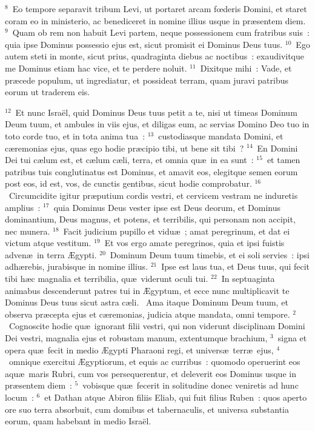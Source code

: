 ${}^{8}$~Eo tempore separavit tribum Levi, ut portaret arcam fœderis Domini, et staret coram eo in ministerio, ac benediceret in nomine illius usque in pr\ae sentem diem.
${}^{9}$~Quam ob rem non habuit Levi partem, neque possessionem cum fratribus suis~: quia ipse Dominus possessio ejus est, sicut promisit ei Dominus Deus tuus.
${}^{10}$~Ego autem steti in monte, sicut prius, quadraginta diebus ac noctibus~: exaudivitque me Dominus etiam hac vice, et te perdere noluit.
${}^{11}$~Dixitque mihi~: Vade, et pr\ae cede populum, ut ingrediatur, et possideat terram, quam juravi patribus eorum ut traderem eis.


${}^{12}$~Et nunc Isra\"el, quid Dominus Deus tuus petit a te, nisi ut timeas Dominum Deum tuum, et ambules in viis ejus, et diligas eum, ac servias Domino Deo tuo in toto corde tuo, et in tota anima tua~:
${}^{13}$~custodiasque mandata Domini, et c\ae remonias ejus, quas ego hodie pr\ae cipio tibi, ut bene sit tibi~?
${}^{14}$~En Domini Dei tui c\ae lum est, et c\ae lum c\ae li, terra, et omnia qu\ae\ in ea sunt~:
${}^{15}$~et tamen patribus tuis conglutinatus est Dominus, et amavit eos, elegitque semen eorum post eos, id est, vos, de cunctis gentibus, sicut hodie comprobatur.
${}^{16}$~Circumcidite igitur pr\ae putium cordis vestri, et cervicem vestram ne induretis amplius~:
${}^{17}$~quia Dominus Deus vester ipse est Deus deorum, et Dominus dominantium, Deus magnus, et potens, et terribilis, qui personam non accipit, nec munera.
${}^{18}$~Facit judicium pupillo et vidu\ae~; amat peregrinum, et dat ei victum atque vestitum.
${}^{19}$~Et vos ergo amate peregrinos, quia et ipsi fuistis adven\ae\ in terra \AE gypti.
${}^{20}$~Dominum Deum tuum timebis, et ei soli servies~: ipsi adh\ae rebis, jurabisque in nomine illius.
${}^{21}$~Ipse est laus tua, et Deus tuus, qui fecit tibi h\ae c magnalia et terribilia, qu\ae\ viderunt oculi tui.
${}^{22}$~In septuaginta animabus descenderunt patres tui in \AE gyptum, et ecce nunc multiplicavit te Dominus Deus tuus sicut astra c\ae li.
~Ama itaque Dominum Deum tuum, et observa pr\ae cepta ejus et c\ae remonias, judicia atque mandata, omni tempore.
${}^{2}$~Cognoscite hodie qu\ae\ ignorant filii vestri, qui non viderunt disciplinam Domini Dei vestri, magnalia ejus et robustam manum, extentumque brachium,
${}^{3}$~signa et opera qu\ae\ fecit in medio \AE gypti Pharaoni regi, et univers\ae\ terr\ae\ ejus,
${}^{4}$~omnique exercitui \AE gyptiorum, et equis ac curribus~: quomodo operuerint eos aqu\ae\ maris Rubri, cum vos persequerentur, et deleverit eos Dominus usque in pr\ae sentem diem~:
${}^{5}$~vobisque qu\ae\ fecerit in solitudine donec veniretis ad hunc locum~:
${}^{6}$~et Dathan atque Abiron filiis Eliab, qui fuit filius Ruben~: quos aperto ore suo terra absorbuit, cum domibus et tabernaculis, et universa substantia eorum, quam habebant in medio Isra\"el.


